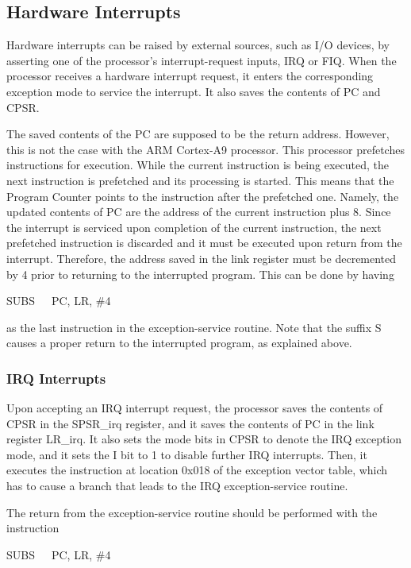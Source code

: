 \documentclass[11pt, twoside, pdftex]{article}
\begin{document}
\subsection{Hardware Interrupts}
\label{sec:hardware_interrupts}

Hardware interrupts can be raised by external sources, such as
I/O devices, by asserting one of the processor's
interrupt-request inputs, IRQ or FIQ.
When the processor receives a hardware interrupt request, it
enters the corresponding exception mode to service the interrupt.
It also saves the contents of PC and CPSR. 

The saved contents of the PC are supposed to be the return
address. However, this is not the case with the ARM Cortex-A9
processor. This processor prefetches instructions for execution.
While the current instruction is being executed, the next
instruction is prefetched and its processing is started.
This means that the Program Counter points to the instruction
after the prefetched one. Namely, the updated contents of PC
are the address of the current instruction plus 8.
Since the interrupt is serviced upon completion of the current
instruction, the next prefetched instruction is discarded and
it must be executed upon return from the interrupt. Therefore,
the address saved in the link register must be decremented
by 4 prior to returning to the interrupted program.
This can be done by having
\begin{center}
SUBS~~~PC, LR, \#4
\end{center}
\noindent
as the last instruction in the exception-service routine.
Note that the suffix S causes a proper return to the interrupted
program, as explained above.

\subsubsection{IRQ Interrupts}
\label{sec:IRQ}

Upon accepting an IRQ interrupt request, the processor 
saves the contents of CPSR in the SPSR\_irq register, and
it saves the contents of PC in the link register LR\_irq.
It also sets the mode bits in CPSR to denote the IRQ exception
mode, and it sets the I bit to 1 to disable further IRQ
interrupts. Then, it executes the instruction at location
0x018 of the exception vector table, which has to cause
a branch that leads to the IRQ exception-service routine.

The return from the exception-service routine should be performed
with the instruction
\begin{center}
SUBS~~~PC, LR, \#4
\end{center}
\noindent
\end{document}
